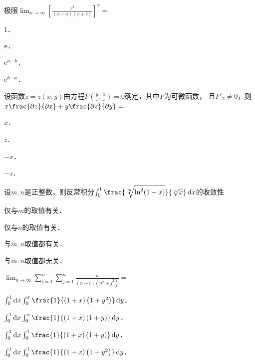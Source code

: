 \documentclass[plain,noanswer,medmath]{../../template/jnuexam}
\begin{document}




\begin{problem}
极限$\lim_{x \to \infty} \left[\frac{x^2}{(x - a)(x + b)} \right]^x =$\pickout{}
\begin{abcd}
\item $1$．
\item $\mathrm{e}$．
\item $\mathrm{e}^{a - b}$．
\item $\mathrm{e}^{b - a}$．
\end{abcd}
\end{problem}


\begin{problem}
设函数$z = z(x,y)$由方程$F\left(\frac{y}{x},\frac{z}{x} \right) = 0$确定，其中$F$为可微函数，
且$F'_2 \ne 0$，则$x\frac{\pdz}{\pdx} + y\frac{\pdz}{\pdy} =$\pickout{}
\begin{abcd}
\item $x$．
\item $z$．
\item $- x$．
\item $- z$．
\end{abcd}
\end{problem}


\begin{problem}
设$m,n$是正整数，则反常积分$\int_0^1 \frac{\sqrt[m]{\ln^2(1 - x)}}{\sqrt[n]{x}}\dx$的收敛性\pickout{}
\begin{abcd}
\item 仅与$m$的取值有关．
\item 仅与$n$的取值有关．
\item 与$m,n$取值都有关．
\item 与$m,n$取值都无关．
\end{abcd}
\end{problem}


\begin{problem}
$\lim_{n\to\infty} \sum_{i=1}^n \sum_{j=1}^n \frac{n}{(n+i)\left(n^2 + j^2 \right)} =$\pickout{}
\begin{abcd}
\item $\int_0^1 \dx\int_0^x \frac{1}{(1 + x)\left(1 + y^2 \right)} \dy$．
\item $\int_0^1 \dx\int_0^x \frac{1}{(1 + x)\left(1 + y \right)} \dy$．
\item $\int_0^1 \dx\int_0^1 \frac{1}{(1 + x)\left(1 + y \right)} \dy$．
\item $\int_0^1 \dx\int_0^1 \frac{1}{(1 + x)\left(1 + y^2 \right)} \dy$．
\end{abcd}
\end{problem}
\end{document}
